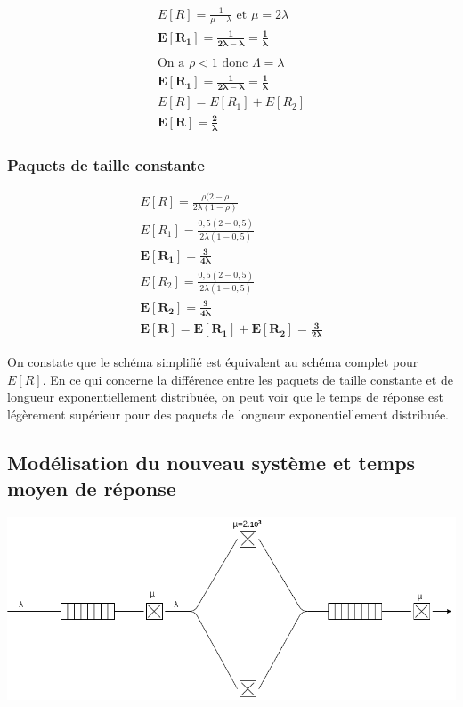\documentclass[12pt, a4paper]{article}
\begin{document}
\begin{gather*}
E[R]=\frac{1}{\mu -\lambda} \text{ et } \mu=2\lambda \\
\bm{E[R_{1}] = \frac{1}{2\lambda - \lambda} = \frac{1}{\lambda}} \\
\\ \text{On a } \rho < 1 \text{ donc } \Lambda = \lambda \\
\bm{E[R_{1}] = \frac{1}{2\lambda - \lambda} = \frac{1}{\lambda}} \\
E[R] = E[R_{1}] + E[R_{2}] \\
\bm{E[R] = \frac{2}{\lambda}}
\end{gather*}

\subsubsection{Paquets de taille constante}

\begin{gather*}
E[R] = \frac{\rho(2-\rho}{2\lambda(1-\rho)} \\
E[R_{1}]=\frac{0,5(2-0,5)}{2\lambda(1-0,5)} \\
\bm{E[R_{1}]=\frac{3}{4\lambda}}\\
E[R_{2}]=\frac{0,5(2-0,5)}{2\lambda(1-0,5)} \\
\bm{E[R_{2}]=\frac{3}{4\lambda}}\\
\bm{E[R] = E[R_{1}] + E[R_{2}] = \frac{3}{2\lambda}}
\end{gather*}
\bigskip

On constate que le sch\'ema simplifi\'e est \'equivalent au sch\'ema complet pour $E[R]$. En ce qui concerne la diff\'erence entre les paquets de taille constante et de longueur exponentiellement distribu\'ee, on peut voir que le temps de r\'eponse est l\'eg\`erement sup\'erieur pour des paquets de longueur exponentiellement distribu\'ee.

\newpage
\subsection{Mod\'elisation du nouveau syst\`eme et temps moyen de r\'eponse}

\includegraphics[width=\linewidth]{exercice4}
\end{document}
